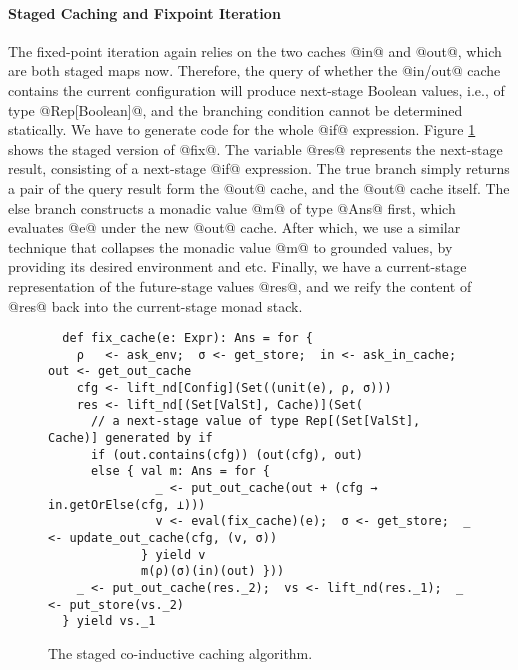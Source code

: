 \paragraph{Staged Caching and Fixpoint Iteration} The fixed-point iteration
again relies on the two caches @in@ and @out@, which are both staged maps now.
Therefore, the query of whether the @in/out@ cache contains the current
configuration will produce next-stage Boolean values, i.e., of type
@Rep[Boolean]@, and the branching condition cannot be determined statically.
We have to generate code for the whole @if@ expression.
Figure \ref{fig:staged_coind_cache} shows the staged version of @fix@. The
variable @res@ represents the next-stage result, consisting of a next-stage
@if@ expression. The true branch simply returns a pair of the query result
form the @out@ cache, and the @out@ cache itself. The else branch constructs a
monadic value @m@ of type @Ans@ first, which evaluates @e@ under the new @out@
cache.  After which, we use a similar technique that collapses the monadic
value @m@ to grounded values, by providing its desired environment and etc.
Finally, we have a current-stage representation of the future-stage values
@res@, and we reify the content of @res@ back into the current-stage monad stack.

\begin{figure}[t]
\centering
\begin{lstlisting}
  def fix_cache(e: Expr): Ans = for {
    ρ   <- ask_env;  σ <- get_store;  in <- ask_in_cache;  out <- get_out_cache
    cfg <- lift_nd[Config](Set((unit(e), ρ, σ)))
    res <- lift_nd[(Set[ValSt], Cache)](Set(
      // a next-stage value of type Rep[(Set[ValSt], Cache)] generated by if
      if (out.contains(cfg)) (out(cfg), out)
      else { val m: Ans = for {
               _ <- put_out_cache(out + (cfg → in.getOrElse(cfg, ⊥)))
               v <- eval(fix_cache)(e);  σ <- get_store;  _ <- update_out_cache(cfg, (v, σ))
             } yield v
             m(ρ)(σ)(in)(out) }))
    _ <- put_out_cache(res._2);  vs <- lift_nd(res._1);  _ <- put_store(vs._2)
  } yield vs._1
\end{lstlisting}
\vspace{-0.5em}
\caption{The staged co-inductive caching algorithm.}
\label{fig:staged_coind_cache}
\vspace{-1.5em}
\end{figure}

